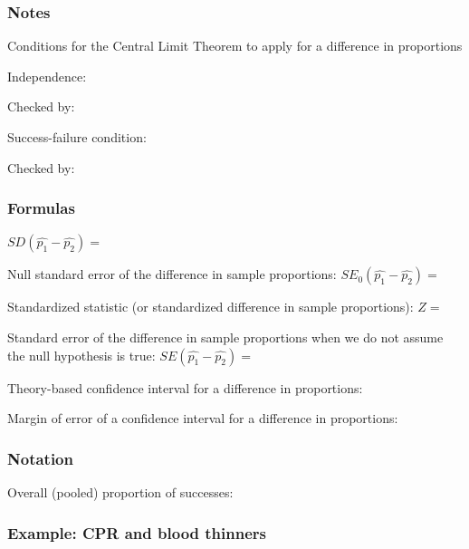 \documentclass[
]{report}
\newcommand{\rgs}{\vspace{12pt}} %
\newcommand{\rgi}{\hspace{24pt}}  %
\begin{document}
\hypertarget{notes-21}{%
\subsubsection*{Notes}\label{notes-21}}

Conditions for the Central Limit Theorem to apply for a difference in proportions

\rgi Independence:
\rgs

\rgi \rgi Checked by:
\rgs

\rgi Success-failure condition:
\rgs

\rgi \rgi Checked by:
\rgs

\hypertarget{formulas-2}{%
\subsubsection*{Formulas}\label{formulas-2}}

\(SD(\hat{p_1} - \hat{p_2})=\)
\rgs

Null standard error of the difference in sample proportions:
\(SE_0(\hat{p_1} - \hat{p_2})=\)
\rgs

Standardized statistic (or standardized difference in sample proportions):
\(Z=\)
\rgs

Standard error of the difference in sample proportions when we do not assume the null hypothesis is true:
\(SE(\hat{p_1} - \hat{p_2})=\)
\rgs

Theory-based confidence interval for a difference in proportions:
\rgs

Margin of error of a confidence interval for a difference in proportions:
\rgs

\hypertarget{notation-1}{%
\subsubsection*{Notation}\label{notation-1}}

Overall (pooled) proportion of successes:
\rgs

\hypertarget{example-cpr-and-blood-thinners-1}{%
\subsubsection*{Example: CPR and blood thinners}\label{example-cpr-and-blood-thinners-1}}
\end{document}
